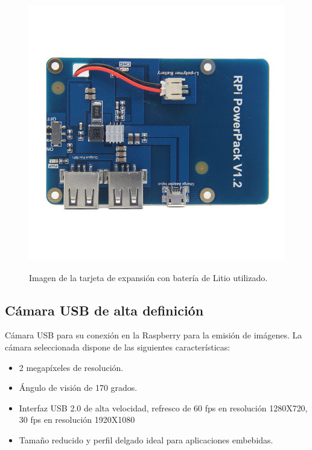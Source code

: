 \begin{figure}[H]
  \begin{center}
    \includegraphics[scale=0.3]{imagenes/robot/modulo-alimentacion.jpg}\\
    \caption{Imagen de la tarjeta de expansión con batería de Litio utilizado.}
  \end{center}
\end{figure}

\subsection{ Cámara USB de alta definición }

Cámara USB para su conexión en la Raspberry para la emisión de imágenes. La cámara seleccionada dispone de las siguientes características:

\begin{itemize}
\item 2 megapíxeles de resolución.
\item Ángulo de visión de 170 grados.
\item Interfaz USB 2.0 de alta velocidad, refresco de 60 fps en resolución 1280X720, 30 fps en resolución 1920X1080
\item Tamaño reducido y perfil delgado ideal para aplicaciones embebidas.
\end{itemize}

